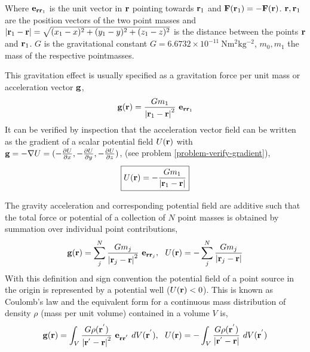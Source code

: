 Where ${\bf e}_{{\bf rr}_1}$ is the unit vector in 
${\bf r}$ pointing towards ${\bf r}_1$
and ${\bf F}({\bf r}_1) = - {\bf F}({\bf r})$.
${\bf r}, {\bf r}_1$ 
are the position vectors of the two point masses
and 
$\left | {\bf r}_1 - {\bf r} \right | =
\sqrt{(x_1-x)^2 + (y_1-y)^2 + (z_1-z)^2}$
is the distance between the points ${\bf r}$ and ${\bf r}_1$.
$G$ is the gravitational constant 
$G = 6.6732 \times 10^{-11} ~\mathrm{Nm^{2}kg^{-2}}$,
$m_0, m_1$ the mass of the respective pointmasses.




This gravitation effect is usually specified as a gravitation force per 
unit mass or acceleration vector ${\bf g}$,
\begin{equation}
{\bf g}({\bf r}) =
   \frac{G m_1}{\left | {\bf r}_1 - {\bf r} \right | ^2} ~ 
                {\bf e}_{{\bf r r}_1} 
\label{grav_accel}
\end{equation}
It can be verified by inspection that the acceleration vector field 
can be written as the 
gradient of a scalar potential field $U({\bf r})$ with
${\bf g} = - \nabla U = 
(- \frac{\partial U}{\partial x}, 
 - \frac{\partial U}{\partial y}, 
 - \frac{\partial U}{\partial z}
)$,
(see problem \ref{problem-verify-gradient}),
\begin{equation}
\boxed{U({\bf r}) = - \frac{G m_1}{\left | {\bf r}_1 - {\bf r} \right |} }
\label{grav_potential}
\end{equation}

The gravity acceleration and corresponding potential field are additive 
such that the total force or potential of a 
collection of $N$ point masses is obtained by summation over individual
point contributions,
\begin{equation}
{\bf g} ({\bf r}) = 
        \sum_j^N \frac{G m_j}{\left | {\bf r}_j - {\bf r} \right | ^2} ~ 
         {\bf e}_{{\bf r r}_j}
,\ \ 
U({\bf r}) = 
        - \sum_j^N \frac{G m_j}{\left | {\bf r}_j - {\bf r} \right |}
\end{equation}
With this definition and sign convention 
the potential field of
a point source in the origin is represented by a
potential well ($U({\bf r}) < 0$).
This is known as Coulomb's law and the equivalent form for a continuous
mass distribution of density $\rho$ (mass per unit volume) contained in
a volume $V$ is,
\begin{equation}
{\bf g}({\bf r}) = 
        \int_V \frac{G \rho({\bf r}^{'})}
                     {\left | {\bf r}^{'} - {\bf r} \right | ^2} ~ 
               {\bf e}_{{\bf r r}^{'}} ~ dV({\bf r}^{'})
,\ \ 
U({\bf r}) = 
        - \int_V \frac{G \rho({\bf r}^{'})}
                     {\left | {\bf r}^{'} - {\bf r} \right |} ~ 
               dV({\bf r}^{'})
\label{Coulomb-integrals}
\end{equation}

